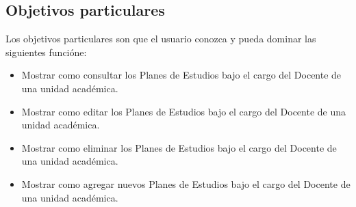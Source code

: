 \subsection{Objetivos particulares}
Los objetivos particulares son que el usuario conozca y pueda dominar las siguientes funcióne:
\begin{itemize}
	\item Mostrar como consultar los Planes de Estudios bajo el cargo del Docente de una unidad académica.
	\item Mostrar como editar los Planes de Estudios bajo el cargo del Docente de una unidad académica.
	\item Mostrar como eliminar los Planes de Estudios bajo el cargo del Docente de una unidad académica.
	\item Mostrar como agregar nuevos Planes de Estudios bajo el cargo del Docente de una unidad académica.

	
	
\end{itemize}
